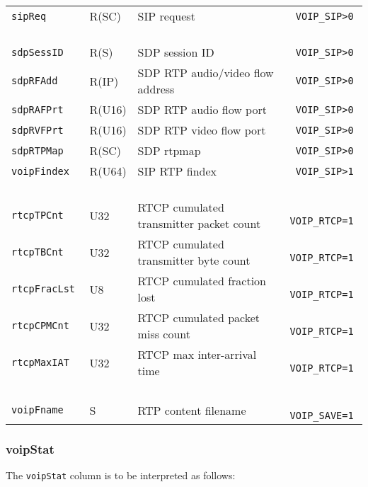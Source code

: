 \documentclass[documentation]{subfiles}
\begin{document}
\begin{longtable}{>{\tt}lll>{\tt\small}l}
    sipReq               & R(SC)      & SIP request                                & VOIP\_SIP>0\\
                         &            &                                            & \\
    sdpSessID            & R(S)       & SDP session ID                             & VOIP\_SIP>0\\
    sdpRFAdd             & R(IP)      & SDP RTP audio/video flow address           & VOIP\_SIP>0\\
    sdpRAFPrt            & R(U16)     & SDP RTP audio flow port                    & VOIP\_SIP>0\\
    sdpRVFPrt            & R(U16)     & SDP RTP video flow port                    & VOIP\_SIP>0\\
    sdpRTPMap            & R(SC)      & SDP rtpmap                                 & VOIP\_SIP>0\\
    voipFindex           & R(U64)     & SIP RTP findex                             & VOIP\_SIP>1\\
                         &            &                                            & \\
    rtcpTPCnt            & U32        & RTCP cumulated transmitter packet count    & VOIP\_RTCP=1\\
    rtcpTBCnt            & U32        & RTCP cumulated transmitter byte count      & VOIP\_RTCP=1\\
    rtcpFracLst          & U8         & RTCP cumulated fraction lost               & VOIP\_RTCP=1\\
    rtcpCPMCnt           & U32        & RTCP cumulated packet miss count           & VOIP\_RTCP=1\\
    rtcpMaxIAT           & U32        & RTCP max inter-arrival time                & VOIP\_RTCP=1\\
                         &            &                                            & \\
    voipFname            & S          & RTP content filename                       & VOIP\_SAVE=1\\
    \bottomrule
\end{longtable}

\subsubsection{voipStat}\label{voipStat}
The {\tt voipStat} column is to be interpreted as follows:
\end{document}
